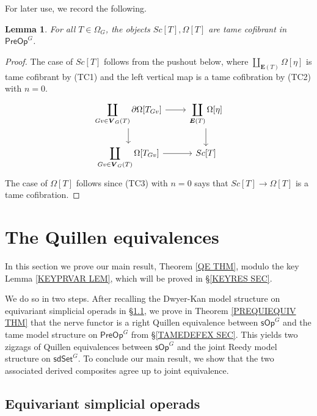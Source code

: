 \documentclass[a4paper,10pt]{article}%
\numberwithin{equation}{section}
\numberwithin{figure}{section}
\newtheorem{lemma}[equation]{Lemma}%
\theoremstyle{definition} %
\newcommand{\sOp}{\ensuremath{\mathsf{sOp}}}%
\newcommand{\sdSet}{\mathsf{sdSet}}
\newcommand{\PreOp}{\mathsf{PreOp}}
\newcommand{\1}{\ensuremath{\mathbbm 1}}%
\begin{document}
For later use, we record the following.

\begin{lemma}\label{OMEGATTAME_LEM}
	For all $T \in \Omega_G$, the objects $Sc[T],\Omega[T]$ are tame cofibrant in $\mathsf{PreOp}^G$.
\end{lemma}

\begin{proof}
	The case of $Sc[T]$ follows from the pushout below, 
	where $\coprod_{\boldsymbol{E}(T)}\Omega[\eta]$
	is tame cofibrant by (TC1) and the left vertical map is 
	a tame cofibration by (TC2) with $n=0$.
	\[
	\begin{tikzcd}
	\displaystyle{
		\coprod_{Gv \in \boldsymbol{V}_G(T)} \partial\Omega[T_{Gv}]
	}
	\arrow[d] \arrow[r]
	&
	\displaystyle{
		\coprod_{\boldsymbol{E}(T)} \Omega[\eta]
	}
	\arrow[d]
	\\
	\displaystyle{
		\coprod_{Gv \in \boldsymbol{V}_G(T)} \Omega[T_{Gv}]
	}
	\arrow[r]
	&
	Sc[T]
	\end{tikzcd}
	\]
	The case of $\Omega[T]$
	follows since (TC3) with $n=0$
	says that $Sc[T] \to \Omega[T]$ is a tame cofibration.
\end{proof}





\section{The Quillen equivalences}
\label{QE_SEC}


In this section we prove our main result, Theorem \ref{QE THM},
modulo the key Lemma \ref{KEYPRVAR LEM}, 
which will be proved in \S \ref{KEYRES SEC}.


We do so in two steps.
After recalling the Dwyer-Kan model structure on equivariant simplicial operads in \S \ref{GSOP_SEC},
we prove in Theorem \ref{PREQUIEQUIV THM} that the nerve functor is a right Quillen equivalence 
between $\mathsf{sOp}^G$ and  
the tame model structure on $\PreOp^G$ from \S \ref{TAMEDEFEX SEC}.
This yields two zigzags of Quillen equivalences between $\sOp^G$ and the joint Reedy model structure on $\sdSet^G$.
To conclude our main result, we show that the two associated derived composites agree up to joint equivalence.




\subsection{Equivariant simplicial operads}
\label{GSOP_SEC}
\end{document}
